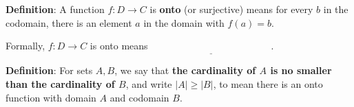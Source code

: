 
{\bf Definition}: A function $f: D  \to C$ is {\bf onto} (or  surjective) means for every $b$ in the codomain, 
there  is an element $a$ in the domain with  $f(a) = b$.


Formally, $f: D  \to  C$ is  onto  means $\underline{\phantom{\forall b \in C  \exists a \in D ( f(a) = b)}}$.


{\bf Definition}:  For sets $A, B$, we say that  {\bf the  cardinality of $A$ is  no  smaller than the cardinality of  $B$}, and 
write $|A| \geq |B|$, to mean there is an onto function  with domain $A$  and codomain $B$.
